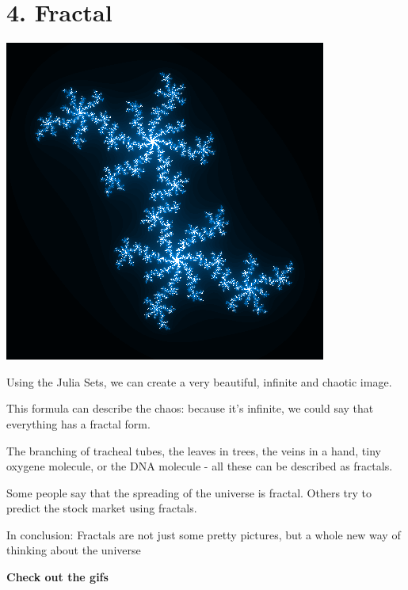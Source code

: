 \documentclass{article}
\begin{document}
    \section{4. Fractal}

    	\begin{center}
			\includegraphics[scale=0.7]{fractal}
		\end{center}
    
		\par Using the Julia Sets, we can create a very beautiful, infinite and chaotic image.

		\par This formula can describe the chaos: because it's infinite, we could say that everything has a fractal form.

		\par The branching of tracheal tubes, the leaves in trees, the veins in a hand, tiny oxygene molecule, or the DNA molecule - all these can be described as fractals.

		\par Some people say that the spreading of the universe is fractal. Others try to predict the stock market using fractals.
		
		\par In conclusion: Fractals are not just some pretty pictures, but a whole new way of thinking about the universe

		\begin{center}
			\par \textbf{Check out the gifs}
		\end{center}
\end{document}
